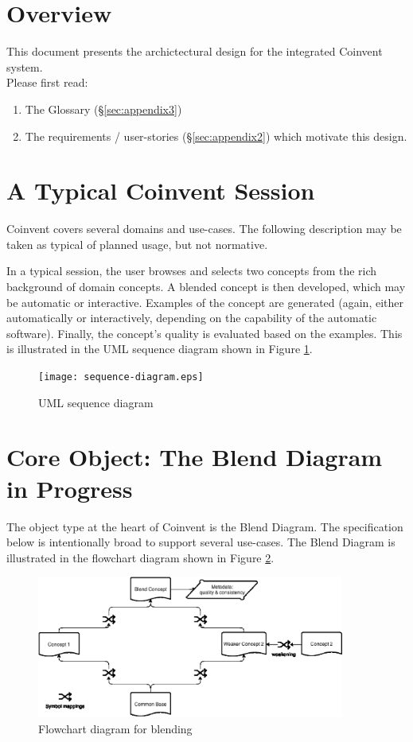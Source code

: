 \section{Overview}\label{sec:overview}

This document presents the archictectural design for the integrated Coinvent system. \mbox{}\\
Please first read:
\begin{enumerate}
\item{The Glossary (\S\ref{sec:appendix3})}
\item{The requirements / user-stories (\S\ref{sec:appendix2}) which motivate this design.}
\end{enumerate}

\section{A Typical Coinvent Session}\label{sec:typical}

Coinvent covers several domains and use-cases. The following description may be taken
as typical of planned usage, but not normative.

In a typical session, the user browses and selects two concepts from the 
rich background of domain concepts. A blended concept is then developed, which
may be automatic or interactive. Examples of the concept are generated (again, either
automatically or interactively, depending on the capability of the automatic software). Finally, the concept's quality is evaluated based on the examples.
This is illustrated in the UML sequence diagram shown in Figure \ref{fig:sequence-diagram}.
\begin{figure}[!ht]
\texttt{[image: sequence-diagram.eps]}
\label{fig:sequence-diagram}
\caption{UML sequence diagram}
\end{figure}

\section{Core Object: The Blend Diagram in Progress}\label{sec:bdip}

The object type at the heart of Coinvent is the Blend Diagram. The specification below is intentionally broad to support several use-cases. The Blend Diagram is illustrated in the flowchart diagram shown in Figure \ref{fig:flowchart}.

\begin{figure}[!ht]
\includegraphics[width=0.9\textwidth]{BlendDiagram.eps}
\caption{Flowchart diagram for blending}
\label{fig:flowchart}
\end{figure}


